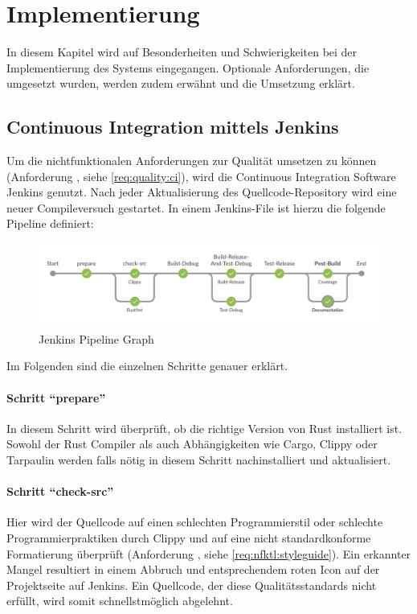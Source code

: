 
\chapter{Implementierung}

In diesem Kapitel wird auf Besonderheiten und Schwierigkeiten bei der Implementierung des Systems eingegangen.
Optionale Anforderungen, die umgesetzt wurden, werden zudem erwähnt und die Umsetzung erklärt.



\section{Continuous Integration mittels Jenkins}

Um die nichtfunktionalen Anforderungen zur Qualität umsetzen zu können (Anforderung , siehe \autoref{req:quality:ci}), wird die Continuous Integration Software Jenkins genutzt.
Nach jeder Aktualisierung des Quellcode-Repository wird eine neuer Compileversuch gestartet.
In einem Jenkins-File ist hierzu die folgende Pipeline definiert:

\begin{figure}[H]
	\includegraphics[width=\textwidth]{images/jenkins_pipeline_graph.png}
	\caption{Jenkins Pipeline Graph}
	\label{impl:jenkins:pipeline:graph}
\end{figure}

Im Folgenden sind die einzelnen Schritte genauer erklärt.


\subsubsection{Schritt \enquote{prepare}}
In diesem Schritt wird überprüft, ob die richtige Version von Rust installiert ist.
Sowohl der Rust Compiler als auch Abhängigkeiten wie Cargo, Clippy oder Tarpaulin werden falls nötig  in diesem Schritt nachinstalliert und aktualisiert.

\subsubsection{Schritt \enquote{check-src}}
Hier wird der Quellcode auf einen schlechten Programmierstil oder schlechte Programmierpraktiken durch Clippy und auf eine nicht standardkonforme Formatierung überprüft (Anforderung , siehe \autoref{req:nfktl:styleguide}).
Ein erkannter Mangel resultiert in einem Abbruch und entsprechendem roten Icon auf der Projektseite auf Jenkins.
Ein Quellcode, der diese Qualitätsstandards nicht erfüllt, wird somit schnellstmöglich abgelehnt.

